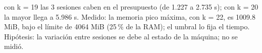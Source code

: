 {con k = 19 las 3 sesiones caben en el presupuesto (de 1.227 a 2.735 s); con k = 20 la mayor llega a 5.986 s.}
{Medido: la memoria pico máxima, con k = 22, es 1009.8 MiB, bajo el límite de 4064 MiB (25\,\% de la RAM); el umbral lo fija el tiempo. Hipótesis: la variación entre sesiones se debe al estado de la máquina; no se midió.}
